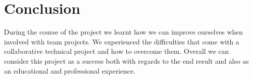 \documentclass[11pt]{article}
\begin{document}
\section{Conclusion}
During the course of the project we learnt how we can improve ourselves when involved with team projects. We experienced the difficulties that come with a collaborative technical project and how to overcome them. Overall we can consider this project as a success both with regards to the end result and also as an educational and professional experience.
\end{document}

